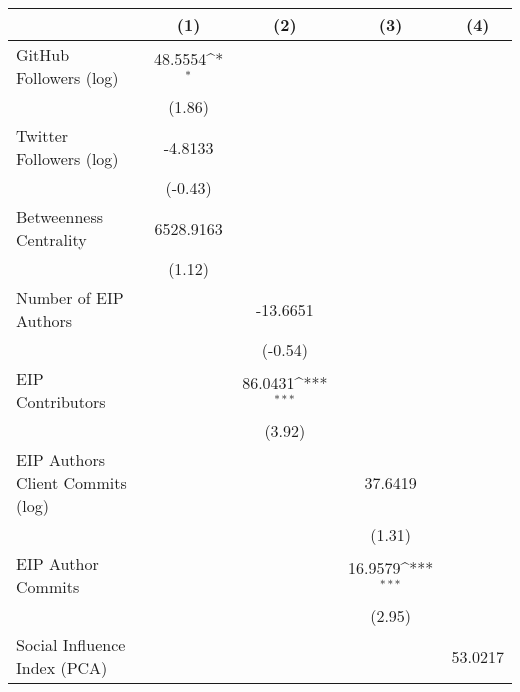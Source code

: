 {
\def\sym#1{\ifmmode^{#1}\else\(^{#1}\)\fi}
\begin{tabular}{l*{4}{c}}
\hline\hline
                                   &\multicolumn{1}{c}{(1)}         &\multicolumn{1}{c}{(2)}         &\multicolumn{1}{c}{(3)}         &\multicolumn{1}{c}{(4)}         \\
\hline
GitHub Followers (log)             &   48.5554\sym{*}  &                   &                   &                   \\
                                   &    (1.86)         &                   &                   &                   \\
[1em]
Twitter Followers (log)            &   -4.8133         &                   &                   &                   \\
                                   &   (-0.43)         &                   &                   &                   \\
[1em]
Betweenness Centrality             & 6528.9163         &                   &                   &                   \\
                                   &    (1.12)         &                   &                   &                   \\
[1em]
Number of EIP Authors              &                   &  -13.6651         &                   &                   \\
                                   &                   &   (-0.54)         &                   &                   \\
[1em]
EIP Contributors                   &                   &   86.0431\sym{***}&                   &                   \\
                                   &                   &    (3.92)         &                   &                   \\
[1em]
EIP Authors Client Commits (log)   &                   &                   &   37.6419         &                   \\
                                   &                   &                   &    (1.31)         &                   \\
[1em]
EIP Author Commits                 &                   &                   &   16.9579\sym{***}&                   \\
                                   &                   &                   &    (2.95)         &                   \\
[1em]
Social Influence Index (PCA)       &                   &                   &                   &   53.0217         \\

\end{tabular}}
